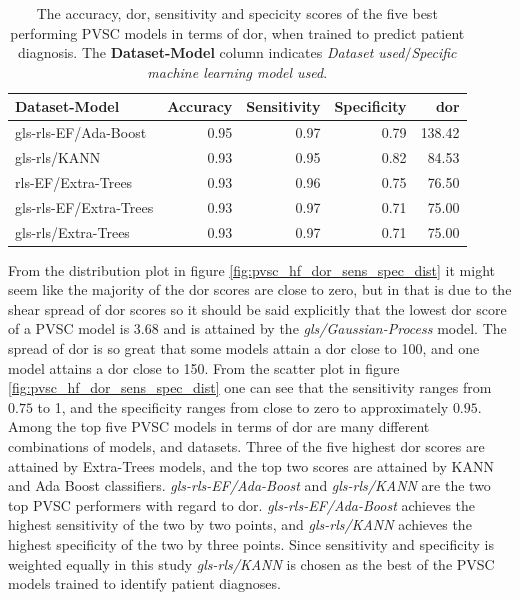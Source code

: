 \begin{table}
    \centering
    \begin{tabular}{lrrrr}
        \toprule
        Dataset-Model          &  Accuracy &  Sensitivity &  Specificity &  \acrshort{dor} \\
        \midrule
        gls-rls-EF/Ada-Boost   &      0.95 &         0.97 &         0.79 & 138.42 \\
        gls-rls/KANN            &      0.93 &         0.95 &         0.82 &  84.53 \\
        rls-EF/Extra-Trees     &      0.93 &         0.96 &         0.75 &  76.50 \\
        gls-rls-EF/Extra-Trees &      0.93 &         0.97 &         0.71 &  75.00 \\
        gls-rls/Extra-Trees    &      0.93 &         0.97 &         0.71 &  75.00 \\
        \bottomrule
    \end{tabular}
    \caption{The accuracy, \acrshort{dor}, sensitivity and specicity scores of the five best performing PVSC models in terms of \acrshort{dor}, when trained to predict patient diagnosis.
             The \textbf{Dataset-Model} column indicates \textit{Dataset used}$/$\textit{Specific machine learning model used}.}
    \label{tab:pvsc_hf_dor_sens_spec_dist}
\end{table}

From the distribution plot in figure \ref{fig:pvsc_hf_dor_sens_spec_dist} it might seem like the majority of the \acrshort{dor} scores are close to zero, but in that is due to the shear spread of \acrshort{dor} scores so it should be said explicitly that the lowest \acrshort{dor} score of a PVSC model is 3.68 and is attained by the \textit{gls/Gaussian-Process} model.
The spread of \acrshort{dor} is so great that some models attain a \acrshort{dor} close to 100, and one model attains a \acrshort{dor} close to 150.
From the scatter plot in figure \ref{fig:pvsc_hf_dor_sens_spec_dist} one can see that the sensitivity ranges from $0.75$ to 1, and the specificity ranges from 
close to zero to approximately $0.95$. 
Among the top five PVSC models in terms of \acrshort{dor} are many different combinations of models, and datasets. 
Three of the five highest \acrshort{dor} scores are attained by Extra-Trees models, and the top two scores are attained by KANN and Ada Boost classifiers. 
\textit{gls-rls-EF/Ada-Boost} and \textit{gls-rls/KANN} are the two top PVSC performers with regard to \acrshort{dor}.
\textit{gls-rls-EF/Ada-Boost} achieves the highest sensitivity of the two by two points, and \textit{gls-rls/KANN} achieves the highest specificity of the two by three points.
Since sensitivity and specificity is weighted equally in this study \textit{gls-rls/KANN} is chosen as the best of the PVSC models trained to identify patient diagnoses.

